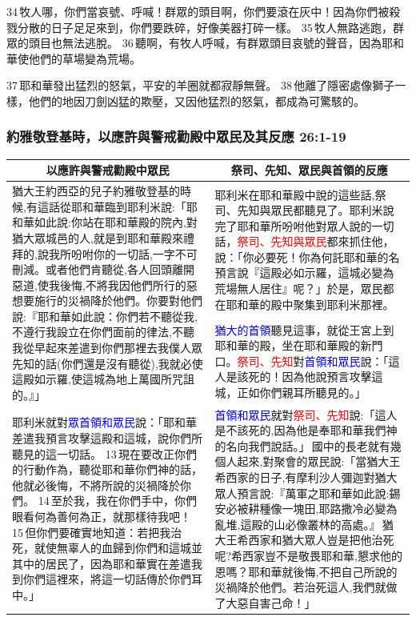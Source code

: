 34 牧人哪，你們當哀號、呼喊！群眾的頭目啊，你們要滾在灰中！因為你們被殺戮分散的日子足足來到，你們要跌碎，好像美器打碎一樣。 35 牧人無路逃跑，群眾的頭目也無法逃脫。 36 聽啊，有牧人呼喊，有群眾頭目哀號的聲音，因為耶和華使他們的草場變為荒場。 

37 耶和華發出猛烈的怒氣，平安的羊圈就都寂靜無聲。 38 他離了隱密處像獅子一樣，他們的地因刀劍凶猛的欺壓，又因他猛烈的怒氣，都成為可驚駭的。

\subsubsection{約雅敬登基時，以應許與警戒勸殿中眾民及其反應 26:1-19}
\begin{table}[H]
\centering
\begin{tabular}{p{8.25cm}|p{8.50cm}}\hline\hline
\multicolumn{1}{c|}{以應許與警戒勸殿中眾民}&\multicolumn{1}{c}{祭司、先知、眾民與首領的反應}\\\hline
\multirow{2}{8.35cm}{猶大王約西亞的兒子約雅敬登基的時候,有這話從耶和華臨到耶利米說:「耶和華如此說:你站在耶和華殿的院內,對猶大眾城邑的人,就是到耶和華殿來禮拜的,說我所吩咐你的一切話,一字不可刪減。或者他們肯聽從,各人回頭離開惡道,使我後悔,不將我因他們所行的惡想要施行的災禍降於他們。你要對他們說:『耶和華如此說：你們若不聽從我,不遵行我設立在你們面前的律法,不聽我從早起來差遣到你們那裡去我僕人眾先知的話(你們還是沒有聽從),我就必使這殿如示羅,使這城為地上萬國所咒詛的。』」}
&耶利米在耶和華殿中說的這些話,祭司、先知與眾民都聽見了。耶利米說完了耶和華所吩咐他對眾人說的一切話，\textcolor{red}{祭司、先知與眾民}都來抓住他，說：「你必要死！你為何託耶和華的名預言說『這殿必如示羅，這城必變為荒場無人居住』呢？」於是，眾民都在耶和華的殿中聚集到耶利米那裡。\\\cline{2-2}
&\textcolor{blue}{猶大的首領}聽見這事，就從王宮上到耶和華的殿，坐在耶和華殿的新門口。\textcolor{red}{祭司、先知}對\textcolor{blue}{首領和眾民}說：「這人是該死的！因為他說預言攻擊這城，正如你們親耳所聽見的。」\\\hline
耶利米就對\textcolor{blue}{眾首領和眾民}說：「耶和華差遣我預言攻擊這殿和這城，說你們所聽見的這一切話。 13 現在要改正你們的行動作為，聽從耶和華你們神的話，他就必後悔，不將所說的災禍降於你們。 14 至於我，我在你們手中，你們眼看何為善何為正，就那樣待我吧！ 15 但你們要確實地知道：若把我治死，就使無辜人的血歸到你們和這城並其中的居民了，因為耶和華實在差遣我到你們這裡來，將這一切話傳於你們耳中。」
&\textcolor{blue}{首領和眾民}就對\textcolor{red}{祭司、先知}說:「這人是不該死的,因為他是奉耶和華我們神的名向我們說話。」 國中的長老就有幾個人起來,對聚會的眾民說:「當猶大王希西家的日子,有摩利沙人彌迦對猶大眾人預言說:『萬軍之耶和華如此說:錫安必被耕種像一塊田,耶路撒冷必變為亂堆,這殿的山必像叢林的高處。』 猶大王希西家和猶大眾人豈是把他治死呢?希西家豈不是敬畏耶和華,懇求他的恩嗎？耶和華就後悔,不把自己所說的災禍降於他們。若治死這人,我們就做了大惡自害己命！」\\\hline

\end{tabular}
\end{table}

